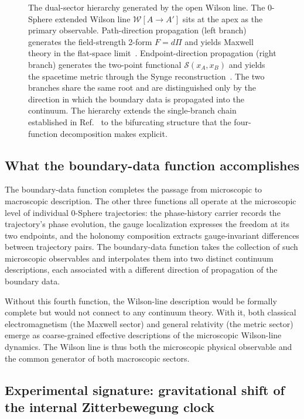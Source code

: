 \documentclass[%
 reprint, amsmath,amssymb, aps, prb, ]{revtex4-2}
\numberwithin{equation}{section}
\newcommand{\WL}{\mathcal{W}}
\begin{document}
\begin{figure}[t!]
\begin{tikzpicture}
\end{tikzpicture}
\caption{The dual-sector hierarchy generated by the open Wilson line. The 0-Sphere extended Wilson line $\WL[A\to A']$ sits at the apex as the primary observable. Path-direction propagation (left branch) generates the field-strength 2-form $F = d\Pi$ and yields Maxwell theory in the flat-space limit~\cite{hanamura54}. Endpoint-direction propagation (right branch) generates the two-point functional $\mathcal{S}(x_A,x_B)$ and yields the spacetime metric through the Synge reconstruction~\cite{hanamura51}. The two branches share the same root and are distinguished only by the direction in which the boundary data is propagated into the continuum. The hierarchy extends the single-branch chain established in Ref.~\cite{hanamura54} to the bifurcating structure that the four-function decomposition makes explicit.}
\label{fig:hierarchy}
\end{figure}

\subsection{What the boundary-data function accomplishes}

The boundary-data function completes the passage from microscopic to macroscopic description. The other three functions all operate at the microscopic level of individual 0-Sphere trajectories: the phase-history carrier records the trajectory's phase evolution, the gauge localization expresses the freedom at its two endpoints, and the holonomy composition extracts gauge-invariant differences between trajectory pairs. The boundary-data function takes the collection of such microscopic observables and interpolates them into two distinct continuum descriptions, each associated with a different direction of propagation of the boundary data.

Without this fourth function, the Wilson-line description would be formally complete but would not connect to any continuum theory. With it, both classical electromagnetism (the Maxwell sector) and general relativity (the metric sector) emerge as coarse-grained effective descriptions of the microscopic Wilson-line dynamics. The Wilson line is thus both the microscopic physical observable and the common generator of both macroscopic sectors.

\subsection{Experimental signature: gravitational shift of the internal Zitterbewegung clock}
\label{sec:experimental_signature}
\end{document}
